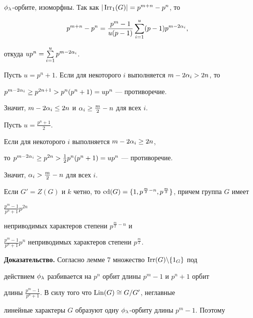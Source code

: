 $\phi_\lambda$-орбите, изоморфны. Так как $|\operatorname{Irr_1}(G)|=p^{m+n}-p^n$, то 


$$


p^{m+n}-p^n=\frac{p^m-1}{u(p-1)}\sum_{i=1}^u(p-1)p^{m-2\al_i},


$$ 


откуда $up^n=\sum\limits_{i=1}^up^{m-2\alpha_i}$. 





Пусть $u=p^n+1$. Если для некоторого $i$ выполняется $m-2\alpha_i>2n$, то 


$p^{m-2\alpha_i}\ge p^{2n+1}>p^n(p^n+1)=up^n$ --- противоречие. 


Значит, $m-2\alpha_i\le2n$ и $\alpha_i\ge\frac m2-n$ для всех $i$.





Пусть $u=\frac{p^n+1}{2}$.


Если для некоторого $i$ выполняется $m-2\alpha_i\ge2n$, 


то $p^{m-2\alpha_i}\ge p^{2n}>\frac12p^n(p^n+1)=up^n$ --- противоречие. 


Значит, $\alpha_i>\frac m2-n$ для всех $i$.








\begin{thm}


Если $G'=Z(G)$ и $k$ четно, то $\cdeg(G)=\lbr1,


p^{\frac m2-n},p^{\frac m2}\rbr$, причем группа $G$ имеет 


$\frac{p^m-1}{p^n+1}p^{2n}$ 


неприводимых характеров степени $p^{\frac m2-n}$ и 


$\frac{p^m-1}{p^n+1}p^{n}$ неприводимых характеров степени $p^{\frac m2}$.


\end{thm}








{\bf Доказательство.} Согласно лемме 7 множество $\operatorname{Irr}(G)\backslash\lbrace1_G\rbrace$ под 


действием $\phi_\lambda$ разбивается на $p^n$ орбит длины $p^m-1$ и $p^n+1$ орбит


длины $\frac{p^m-1}{p^n+1}$. В силу того что $\operatorname{Lin}(G)\cong G/G'$, неглавные 


линейные характеры $G$ образуют одну $\phi_\lambda$-орбиту длины $p^m-1$. Поэтому


